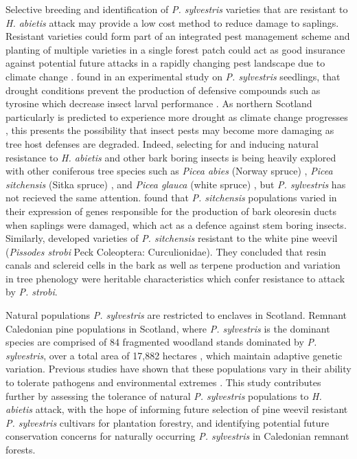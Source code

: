 \documentclass[a4paper, 11pt]{article}
\begin{document}
Selective breeding and identification of \textit{P. sylvestris} varieties that are resistant to \textit{H. abietis} attack may provide a low cost method to reduce damage to saplings. Resistant varieties could form part of an integrated pest management scheme \citep{Telford2014} and planting of multiple varieties in a single forest patch could act as good insurance against potential future attacks in a rapidly changing pest landscape due to climate change \citep{Alfaro2014}. \citet{MacAllister2019} found in an experimental study on \textit{P. sylvestris} seedlings, that drought conditions prevent the production of defensive compounds such as tyrosine which decrease insect larval performance \citep{Lokvam2006}. As northern Scotland particularly is predicted to experience more drought as climate change progresses \citep{Gosling2014}, this presents the possibility that insect pests may become more damaging as tree host defenses are degraded. Indeed, selecting for and inducing natural resistance to \textit{H. abietis} and other bark boring insects is being heavily explored with other coniferous tree species such as \textit{Picea abies} (Norway spruce) \citep{Eyles2009, Schiebe2012}, \textit{Picea sitchensis} (Sitka spruce) \citep{King2011}, and \textit{Picea glauca} (white spruce) \citep{Kiss1991}, but \textit{P. sylvestris} has not recieved the same attention. \citet{Byun2006} found that \textit{P. sitchensis} populations varied in their expression of genes responsible for the production of bark oleoresin ducts when saplings were damaged, which act as a defence against stem boring insects. Similarly, \citet{Alfaro2013} developed varieties of \textit{P. sitchensis} resistant to the white pine weevil (\textit{Pissodes strobi} Peck Coleoptera: Curculionidae). They concluded that resin canals and sclereid cells in the bark as well as terpene production and variation in tree phenology were heritable characteristics which confer resistance to attack by \textit{P. strobi}.

Natural populations \textit{P. sylvestris} are restricted to enclaves in Scotland. Remnant Caledonian pine populations in Scotland, where \textit{P. sylvestris} is the dominant species \citep{Edwards2006} are comprised of 84 fragmented woodland stands dominated by \textit{P. sylvestris}, over a total area of 17,882 hectares \citep{Mason2004}, which maintain adaptive genetic variation. Previous studies have shown that these populations vary in their ability to tolerate pathogens \citep{Perry2016} and environmental extremes \citep{Salmela2013}. This study contributes further by assessing the tolerance of natural \textit{P. sylvestris} populations to \textit{H. abietis} attack, with the hope of informing future selection of pine weevil resistant \textit{P. sylvestris} cultivars for plantation forestry, and identifying potential future conservation concerns for naturally occurring \textit{P. sylvestris} in Caledonian remnant forests. 
\end{document}
